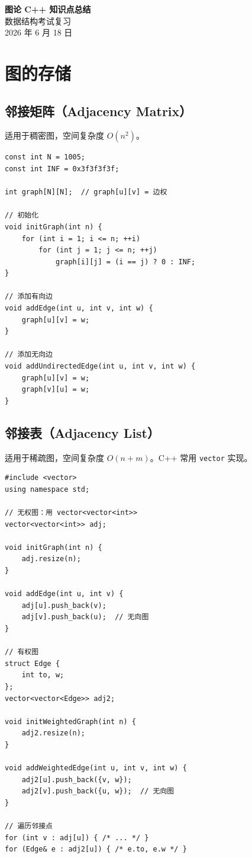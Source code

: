 \documentclass[12pt,a4paper]{article}
\begin{document}
\begin{center}
    {\Huge\bfseries 图论 C++ 知识点总结}\\[0.3cm]
    {\large 数据结构考试复习}\\[0.2cm]
    {2026 年 6 月 18 日}
\end{center}
\vspace{0.3cm}

\tableofcontents
\newpage

\section{图的存储}

\subsection{邻接矩阵（Adjacency Matrix）}
适用于稠密图，空间复杂度 $O(n^2)$。

\begin{lstlisting}[caption={邻接矩阵存储}]
const int N = 1005;
const int INF = 0x3f3f3f3f;

int graph[N][N];  // graph[u][v] = 边权

// 初始化
void initGraph(int n) {
    for (int i = 1; i <= n; ++i)
        for (int j = 1; j <= n; ++j)
            graph[i][j] = (i == j) ? 0 : INF;
}

// 添加有向边
void addEdge(int u, int v, int w) {
    graph[u][v] = w;
}

// 添加无向边
void addUndirectedEdge(int u, int v, int w) {
    graph[u][v] = w;
    graph[v][u] = w;
}
\end{lstlisting}

\subsection{邻接表（Adjacency List）}
适用于稀疏图，空间复杂度 $O(n + m)$。C++ 常用 \texttt{vector} 实现。

\begin{lstlisting}[caption={邻接表存储（vector 实现）}]
#include <vector>
using namespace std;

// 无权图：用 vector<vector<int>>
vector<vector<int>> adj;

void initGraph(int n) {
    adj.resize(n);
}

void addEdge(int u, int v) {
    adj[u].push_back(v);
    adj[v].push_back(u);  // 无向图
}

// 有权图
struct Edge {
    int to, w;
};
vector<vector<Edge>> adj2;

void initWeightedGraph(int n) {
    adj2.resize(n);
}

void addWeightedEdge(int u, int v, int w) {
    adj2[u].push_back({v, w});
    adj2[v].push_back({u, w});  // 无向图
}

// 遍历邻接点
for (int v : adj[u]) { /* ... */ }
for (Edge& e : adj2[u]) { /* e.to, e.w */ }
\end{lstlisting}
\end{document}

